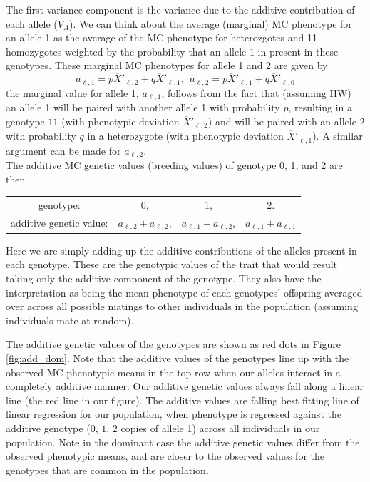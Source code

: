The first variance component is the variance due to
the additive contribution of each allele ($V_A$). 
We can think about the average
(marginal) MC
phenotype for an allele 1 as the average of the MC phenotype
for heterozgotes and 11 homozygotes weighted by the probability that
an allele $1$ in present in these genotypes. 
These marginal MC
phenotypes for allele 1 and 2 are given by 
\begin{equation} 
a_{\ell, 1} = p\overline{X}'_{\ell,2}  + q\overline{X}'_{\ell,1}, ~~ a_{\ell, 2} = p\overline{X}'_{\ell,1}  + q\overline{X}'_{\ell,0} 
\end{equation}
the marginal value for allele 1, $a_{\ell, 1}$,  follows from the fact that (assuming HW) an allele 1 will be
paired with another allele 1 with probability $p$, resulting in a
genotype $11$ (with phenotypic deviation $\overline{X}'_{\ell,2}$) and will
be paired with an allele 2 with probability $q$ in a heterozygote
(with phenotypic deviation $\overline{X}'_{\ell,1}$). A similar argument
can be made for $a_{\ell, 2}$. \\

The additive MC genetic values (breeding values) of genotype 0, 1, and
2 are then 
\begin{center}
\begin{tabular}{cccc}
genotype: & 0, & 1, & 2.\\
additive genetic value: & $a_{\ell,2}+ a_{\ell,2}$, & $a_{\ell,1}+a_{\ell,2}$, & $a_{\ell,1}+a_{\ell,1}$   \label{add_values}
\end{tabular}
\end{center}
%
Here we are simply adding up the additive contributions of the alleles present
in each genotype. These are the genotypic values of the trait that would result
taking only the additive component of the genotype.  They also have the
interpretation as being the mean phenotype of each genotypes' offspring
averaged over across all possible matings to other individuals in the
population (assuming individuals mate at random). 

The additive genetic values of the genotypes are shown as red dots in Figure
\ref{fig:add_dom}. Note that the additive values of the genotypes line up with
the observed MC phenotypic means in the top row when our alleles interact in a
completely additive manner. Our additive genetic values always fall along a
linear line (the red line in our figure). The additive values are falling best
fitting line of linear regression for our population, when phenotype is
regressed against the additive genotype ($0$, $1$, $2$ copies of allele 1)
across all individuals in our population. Note in the dominant case the
additive genetic values differ from the observed phenotypic means, and are
closer to the observed values for the genotypes that are common in the
population. \\

